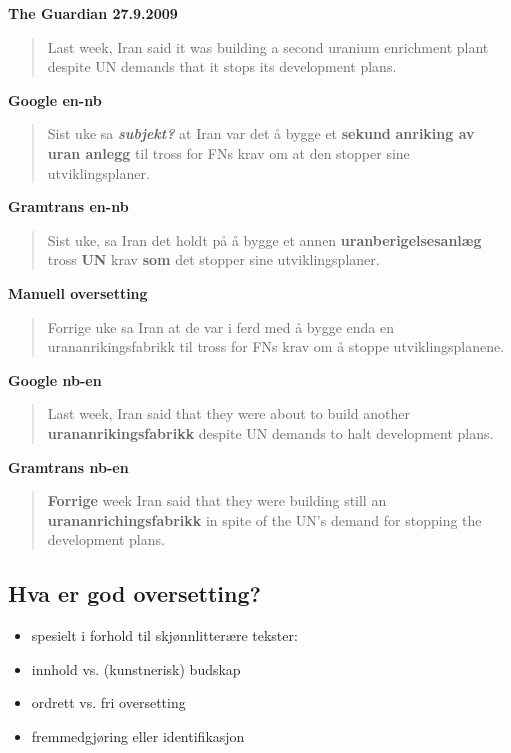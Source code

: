 \documentclass[a4paper,english,12pt]{article}
\begin{document}
\begin{spacing}{1.0}
\textbf{The Guardian 27.9.2009}
\begin{quote}
Last week, Iran said it was building a second uranium enrichment plant despite UN demands that it stops its development plans.
\end{quote}  


\textbf{Google en-nb}
\begin{quote}
Sist uke sa \textit{\textbf{subjekt?}} at Iran var det å bygge et \textbf{sekund} \textbf{anriking av uran anlegg} til tross for FNs krav om at den stopper sine utviklingsplaner.
\end{quote}  

\textbf{Gramtrans en-nb}
\begin{quote}
Sist uke, sa Iran det holdt på å bygge et annen \textbf{uranberigelsesanlæg} tross \textbf{UN} krav \textbf{som} det stopper sine utviklingsplaner.
\end{quote}

\textbf{Manuell oversetting}
\begin{quote}
Forrige uke sa Iran at de var i ferd med å bygge enda en urananrikingsfabrikk til tross for FNs krav om å stoppe utviklingsplanene.
\end{quote}


\textbf{Google nb-en} 
\begin{quote}
Last week, Iran said that they were about to build another \textbf{urananrikingsfabrikk} despite UN demands to halt development plans.
\end{quote}

\textbf{Gramtrans nb-en}
\begin{quote}
\textbf{Forrige} week Iran said that they were building still an \textbf{urananrichingsfabrikk} in spite of the UN's demand for stopping the development plans.
\end{quote}

 

\subsection{Hva er god oversetting?} 
\begin{itemize}
\item spesielt i forhold til skjønnlitterære tekster:
\item innhold vs. (kunstnerisk) budskap
\item ordrett vs. fri oversetting 
\item fremmedgjøring eller identifikasjon 
\end{itemize} 
 


\end{spacing}
\end{document}
